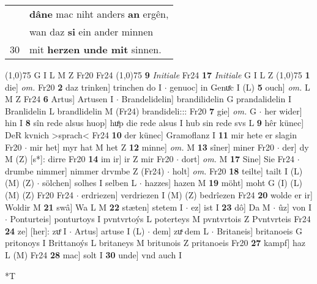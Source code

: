 \documentclass[8pt,a4paper,notitlepage]{article}
\begin{document}
\begin{table}[ht]
\begin{minipage}[t]{0.5\linewidth}
\begin{tabular}{rl}
 & \textbf{dâ}\textbf{ne} mac niht anders \textbf{an} ergên,\\ 
 & wan daz \textbf{si} ein ander minnen\\ 
30 & mit \textbf{herzen unde mit} sinnen.\\ 
\end{tabular}
\scriptsize
\line(1,0){75} \newline
G I L M Z Fr20 Fr24 \newline
\line(1,0){75} \newline
\textbf{9} \textit{Initiale} Fr24  \textbf{17} \textit{Initiale} G I L Z  \newline
\line(1,0){75} \newline
\textbf{1} die] \textit{om.} Fr20 \textbf{2} daz trinken] trinchen do I  $\cdot$ genuoc] in Genuͤc I (L) \textbf{5} ouch] \textit{om.} L M Z Fr24 \textbf{6} Artus] Artusen I  $\cdot$ Brandelidelin] brandilidelin G prandalidelin I Branlidelin L brandlidelin M (Fr24) brandideli::: Fr20 \textbf{7} gie] \textit{om.} G  $\cdot$ her wider] hin I \textbf{8} sîn rede alsus huop] huͤp die rede alsus I hub sin rede svs L \textbf{9} hêr künec] DeR kvnich >sprach< Fr24 \textbf{10} der künec] Gramoflanz I \textbf{11} mir hete er slagin Fr20  $\cdot$ mir het] myr hat M het Z \textbf{12} minne] \textit{om.} M \textbf{13} sîner] miner Fr20  $\cdot$ der] dy M (Z) [s*]: dirre  Fr20 \textbf{14} im ir] ir Z mir Fr20  $\cdot$ dort] \textit{om.} M \textbf{17} Sine] Sie Fr24  $\cdot$ drumbe nimmer] nimmer drvmbe Z (Fr24)  $\cdot$ holt] \textit{om.} Fr20 \textbf{18} teilte] tailt I (L) (M) (Z)  $\cdot$ sölchen] solhes I selben L  $\cdot$ hazzes] hazen M \textbf{19} möht] moht G (I) (L) (M) (Z) Fr20 Fr24  $\cdot$ erdriezen] verdriezen I (M) (Z) bedrîezen Fr24 \textbf{20} wolde er ir] Woldir M \textbf{21} swâ] Wa L M \textbf{22} stæten] stetem I  $\cdot$ ez] ist I \textbf{23} dô] Da M  $\cdot$ ûz] von I  $\cdot$ Ponturteis] ponturtoys I pvntvrtoýs L poterteys M pvntvrtois Z Pvntvrteis Fr24 \textbf{24} ze] [her]: zuͤ I  $\cdot$ Artus] artuse I (L)  $\cdot$ dem] zuͯ dem L  $\cdot$ Britaneis] britanoeis G pritonoys I Brittanoýs L britaneys M britunois Z pritanoeis Fr20 \textbf{27} kampf] haz L (M) Fr24 \textbf{28} mac] solt I \textbf{30} unde] vnd auch I \newline
\end{minipage}
\hspace{0.5cm}
\begin{minipage}[t]{0.5\linewidth}
\small
\begin{center}*T
\end{center}

\end{minipage}
\end{table}
\end{document}
